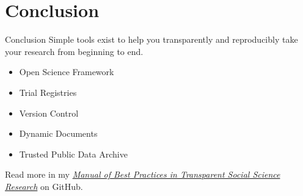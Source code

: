 \documentclass{beamer}
\begin{document}
\section{Conclusion}
\begin{frame}{Conclusion}
Simple tools exist to help you transparently and reproducibly take your research from beginning to end. 
\begin {itemize}
\item Open Science Framework
\item Trial Registries
\item Version Control
\item Dynamic Documents
\item Trusted Public Data Archive
\end{itemize} 
\vspace{0.25in}
Read more in my \href{http://github.com/garretchristensen/manual}{\textit{Manual of Best Practices in Transparent Social Science Research}} on GitHub.
\end{frame}
\end{document}
